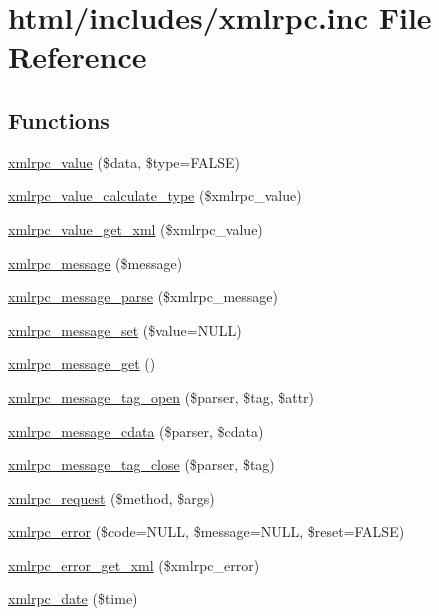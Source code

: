 \hypertarget{xmlrpc_8inc}{
\section{html/includes/xmlrpc.inc File Reference}
\label{xmlrpc_8inc}
}
\subsection*{Functions}
\begin{DoxyCompactItemize}
\item 
\hyperlink{xmlrpc_8inc_af88c4a9120094b9280ddc4d90bc51987}{xmlrpc\_\-value} (\$data, \$type=FALSE)
\item 
\hyperlink{xmlrpc_8inc_a6322ce2ad550e7f873ab2b9cd6699e26}{xmlrpc\_\-value\_\-calculate\_\-type} (\$xmlrpc\_\-value)
\item 
\hyperlink{xmlrpc_8inc_ad06538892136f5c1edb0580b2432e189}{xmlrpc\_\-value\_\-get\_\-xml} (\$xmlrpc\_\-value)
\item 
\hyperlink{xmlrpc_8inc_a623f37020bfae3dec50facefc4cdcdac}{xmlrpc\_\-message} (\$message)
\item 
\hyperlink{xmlrpc_8inc_ad105844dad0a30254611d32284350dc4}{xmlrpc\_\-message\_\-parse} (\$xmlrpc\_\-message)
\item 
\hyperlink{xmlrpc_8inc_a82e3428ca6ed8e4d1ddc377fbc77d8dc}{xmlrpc\_\-message\_\-set} (\$value=NULL)
\item 
\hyperlink{xmlrpc_8inc_a8ee9baa0e35c9f75da4705403ec1c502}{xmlrpc\_\-message\_\-get} ()
\item 
\hyperlink{xmlrpc_8inc_af6f1ebfc3ddbd60f36e1058b1cb257de}{xmlrpc\_\-message\_\-tag\_\-open} (\$parser, \$tag, \$attr)
\item 
\hyperlink{xmlrpc_8inc_a74f16ef34915c5b73e28a69a02e773c8}{xmlrpc\_\-message\_\-cdata} (\$parser, \$cdata)
\item 
\hyperlink{xmlrpc_8inc_aee4cd82346eac26c40587fc89cddb02f}{xmlrpc\_\-message\_\-tag\_\-close} (\$parser, \$tag)
\item 
\hyperlink{xmlrpc_8inc_a21b3f792f935fd99fc444c82493aaca9}{xmlrpc\_\-request} (\$method, \$args)
\item 
\hyperlink{xmlrpc_8inc_aabf20dbe18bd511ce0aceedc087a15fd}{xmlrpc\_\-error} (\$code=NULL, \$message=NULL, \$reset=FALSE)
\item 
\hyperlink{xmlrpc_8inc_aaca4578f8a9f0c150c056f61aa62e806}{xmlrpc\_\-error\_\-get\_\-xml} (\$xmlrpc\_\-error)
\item 
\hyperlink{xmlrpc_8inc_a16688c083542abbf89dfd3fc63907c76}{xmlrpc\_\-date} (\$time)

\end{DoxyCompactItemize}
